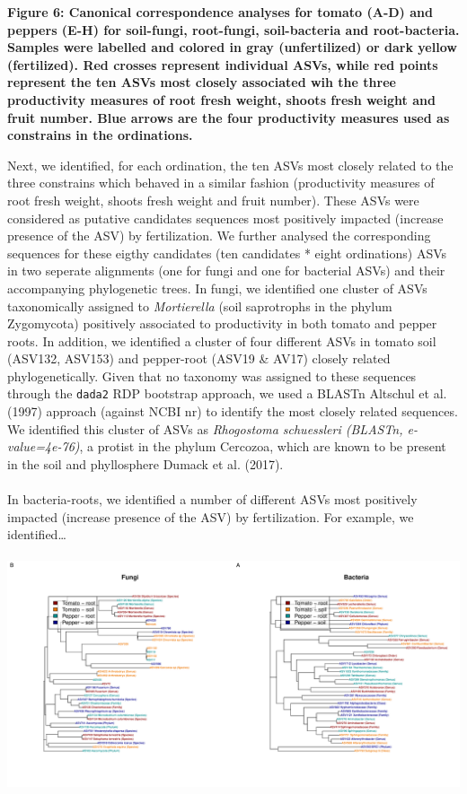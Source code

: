 \documentclass[11pt,]{article}
\begin{document}
\textbf{Figure 6: Canonical correspondence analyses for tomato (A-D) and
peppers (E-H) for soil-fungi, root-fungi, soil-bacteria and
root-bacteria. Samples were labelled and colored in gray (unfertilized)
or dark yellow (fertilized). Red crosses represent individual ASVs,
while red points represent the ten ASVs most closely associated wih the
three productivity measures of root fresh weight, shoots fresh weight
and fruit number. Blue arrows are the four productivity measures used as
constrains in the ordinations.} ~\\
\hspace*{0.333em}

\newpage  

Next, we identified, for each ordination, the ten ASVs most closely
related to the three constrains which behaved in a similar fashion
(productivity measures of root fresh weight, shoots fresh weight and
fruit number). These ASVs were considered as putative candidates
sequences most positively impacted (increase presence of the ASV) by
fertilization. We further analysed the corresponding sequences for these
eigthy candidates (ten candidates * eight ordinations) ASVs in two
seperate alignments (one for fungi and one for bacterial ASVs) and their
accompanying phylogenetic trees. In fungi, we identified one cluster of
ASVs taxonomically assigned to \emph{Mortierella} (soil saprotrophs in
the phylum Zygomycota) positively associated to productivity in both
tomato and pepper roots. In addition, we identified a cluster of four
different ASVs in tomato soil (ASV132, ASV153) and pepper-root (ASV19 \&
AV17) closely related phylogenetically. Given that no taxonomy was
assigned to these sequences through the \texttt{dada2} RDP bootstrap
approach, we used a BLASTn Altschul et al. (1997) approach (against NCBI
nr) to identify the most closely related sequences. We identified this
cluster of ASVs as \emph{Rhogostoma schuessleri (BLASTn,
e-value=4e-76)}, a protist in the phylum Cercozoa, which are known to be
present in the soil and phyllosphere Dumack et al. (2017).\\
\hspace*{0.333em}\\
In bacteria-roots, we identified a number of different ASVs most
positively impacted (increase presence of the ASV) by fertilization. For
example, we identified\ldots{} ~\\
\hspace*{0.333em}\\
\includegraphics{../figures/Figure7_candidateASVs.pdf}\\
\end{document}
